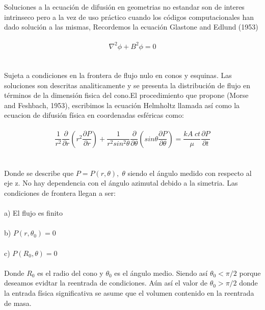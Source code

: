 \documentclass[10pt,a4paper]{report}
\begin{document}
\newpage
Soluciones a la ecuación de difusión en geometrias no estandar son de interes intrinseco pero a la vez de uso práctico cuando los códigos computacionales han dado solución a las mismas, Recordemos la ecuación Glastone and Edlund (1953)
\\
\ \\ $$\nabla^2 \phi + B^2 \phi = 0$$
\\
\ \\ Sujeta a condiciones en la frontera de flujo nulo en conos y esquinas. Las soluciones son descritas analiticamente y se presenta la distribución de flujo en términos de la dimensión fisica del cono.El procedimiento que propone (Morse and Feshbach, 1953), escribimos la ecuación Helmholtz llamada así como la ecuacion de difusión física en coordenadas esféricas como:
\\
\ \\ $$\displaystyle \frac{1}{r^2} \frac{\partial}{\partial r} \left( r^2 \frac{\partial P}{\partial r} \right) + 
\frac{1}{r^2 sin^2 \theta} \frac{\partial}{\partial \theta} \left( sin \theta \frac{\partial P}{\partial \theta } \right) = \frac{k A \; ct}{\mu} \frac{\partial P}{\partial t}$$
\\
\ \\ Donde se describe que $P = P(r, \theta) , \; \theta$ siendo el ángulo medido con respecto al eje z. No hay dependencia con el ángulo azimutal debido a la simetria. Las condiciones de frontera llegan a ser:
\\
\ \\ a) El flujo es finito
\\
\ \\ b) $P \left( r , \theta_0 \right) = 0$
\\ 
\ \\ c) $P \left( R_0 , \theta \right) = 0$
\\
\ \\ Donde $R_0$ es el radio del cono y $\theta_0$ es el ángulo medio. Siendo así $\theta_0 < \pi/2$ porque deseamos evidtar la reentrada de condiciones. Aún así el valor de $\theta_0 > \pi/2$ donde la entrada física significativa se asume que el volumen contenido en la reentrada de masa.
\end{document}
